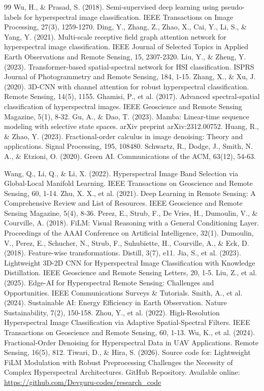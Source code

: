 \documentclass[pdflatex,sn-mathphys-num,iicol]{sn-jnl}
\begin{document}
\begin{thebibliography}{99}
 Wu, H., \& Prasad, S. (2018). Semi-supervised deep learning using pseudo-labels for hyperspectral image classification. IEEE Transactions on Image Processing, 27(3), 1259-1270.
 Ding, Y., Zhang, Z., Zhao, X., Cai, Y., Li, S., \& Yang, Y. (2021). Multi-scale receptive field graph attention network for hyperspectral image classification. IEEE Journal of Selected Topics in Applied Earth Observations and Remote Sensing, 15, 2307-2320.
 Liu, Y., \& Zheng, Y. (2023). Transformer-based spatial-spectral network for HSI classification. ISPRS Journal of Photogrammetry and Remote Sensing, 184, 1-15.
 Zhang, X., \& Xu, J. (2020). 3D-CNN with channel attention for robust hyperspectral classification. Remote Sensing, 14(5), 1155.
 Ghamisi, P., et al. (2017). Advanced spectral-spatial classification of hyperspectral images. IEEE Geoscience and Remote Sensing Magazine, 5(1), 8-32.
 Gu, A., \& Dao, T. (2023). Mamba: Linear-time sequence modeling with selective state spaces. arXiv preprint arXiv:2312.00752.
 Huang, R., \& Zhao, Y. (2023). Fractional-order calculus in image denoising: Theory and applications. Signal Processing, 195, 108480.
 Schwartz, R., Dodge, J., Smith, N. A., \& Etzioni, O. (2020). Green AI. Communications of the ACM, 63(12), 54-63.

 Wang, Q., Li, Q., \& Li, X. (2022). Hyperspectral Image Band Selection via Global-Local Manifold Learning. IEEE Transactions on Geoscience and Remote Sensing, 60, 1-14.
 Zhu, X. X., et al. (2021). Deep Learning in Remote Sensing: A Comprehensive Review and List of Resources. IEEE Geoscience and Remote Sensing Magazine, 5(4), 8-36.
 Perez, E., Strub, F., De Vries, H., Dumoulin, V., \& Courville, A. (2018). FiLM: Visual Reasoning with a General Conditioning Layer. Proceedings of the AAAI Conference on Artificial Intelligence, 32(1).
 Dumoulin, V., Perez, E., Schucher, N., Strub, F., Suhubiette, H., Courville, A., \& Eck, D. (2018). Feature-wise transformations. Distill, 3(7), e11.
 Jia, S., et al. (2023). Lightweight 3D-2D CNN for Hyperspectral Image Classification with Knowledge Distillation. IEEE Geoscience and Remote Sensing Letters, 20, 1-5.
 Liu, Z., et al. (2025). Edge-AI for Hyperspectral Remote Sensing: Challenges and Opportunities. IEEE Communications Surveys \& Tutorials.
 Smith, A., et al. (2024). Sustainable AI: Energy Efficiency in Earth Observation. Nature Sustainability, 7(2), 150-158.
 Zhou, Y., et al. (2022). High-Resolution Hyperspectral Image Classification via Adaptive Spatial-Spectral Filters. IEEE Transactions on Geoscience and Remote Sensing, 60, 1-13.
 Wu, K., et al. (2024). Fractional-Order Denoising for Hyperspectral Data in UAV Applications. Remote Sensing, 16(5), 812.
 Tiwari, D., \& Hira, S. (2026). Source code for: Lightweight FiLM Modulation with Robust Preprocessing Challenges the Necessity of Complex Hyperspectral Architectures. GitHub Repository. Available online: \url{https://github.com/Devguru-codes/research_code}
\end{thebibliography}
\end{document}

